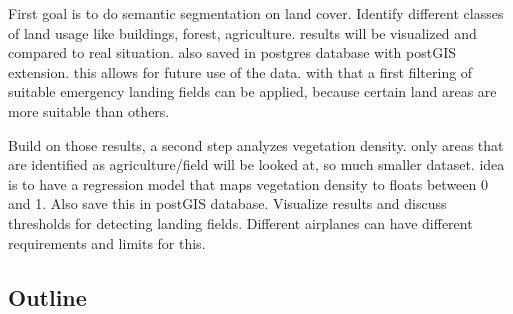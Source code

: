 First goal is to do semantic segmentation on land cover. Identify different classes of land usage like buildings, forest, agriculture. results will be visualized and compared to real situation. also saved in postgres database with postGIS extension. this allows for future use of the data. with that a first filtering of suitable emergency landing fields can be applied, because certain land areas are more suitable than others.

Build on those results, a second step analyzes vegetation density. only areas that are identified as  agriculture/field will be looked at, so much smaller dataset. idea is to have a regression model that maps vegetation density to floats between 0 and 1. Also save this in postGIS database. Visualize results and discuss thresholds for detecting landing fields. Different airplanes can have different requirements and limits for this.

\subsection{Outline}

\newpage